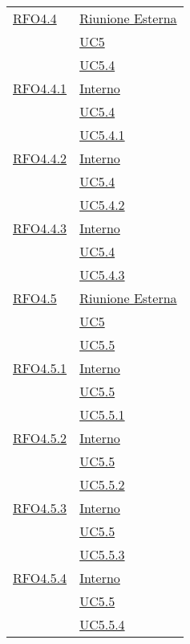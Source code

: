 \begin{longtable}{|>{\centering}m{5cm}|m{5cm}<{\centering}|}
\hyperlink{RFO4.4}{RFO4.4} &\hyperlink{Riunione Esterna}{Riunione Esterna}\\ &\hyperref[UC5]{UC5}\\ &\hyperref[UC5.4]{UC5.4}\\ \hline

\hyperlink{RFO4.4.1}{RFO4.4.1} &  \hyperlink{Interno}{Interno}\\ &\hyperref[UC5.4]{UC5.4}\\ &\hyperref[UC5.4.1]{UC5.4.1}\\ \hline

\hyperlink{RFO4.4.2}{RFO4.4.2} &  \hyperlink{Interno}{Interno}\\ &\hyperref[UC5.4]{UC5.4}\\ &\hyperref[UC5.4.2]{UC5.4.2}\\ \hline

\hyperlink{RFO4.4.3}{RFO4.4.3} & \hyperlink{Interno}{Interno}\\ &\hyperref[UC5.4]{UC5.4}\\ &\hyperref[UC5.4.3]{UC5.4.3}\\ \hline

\hyperlink{RFO4.5}{RFO4.5} &  \hyperlink{Riunione Esterna}{Riunione Esterna}\\ &\hyperref[UC5]{UC5}\\ &\hyperref[UC5.5]{UC5.5}\\ \hline

\hyperlink{RFO4.5.1}{RFO4.5.1} & \hyperlink{Interno}{Interno}\\ &\hyperref[UC5.5]{UC5.5}\\ &\hyperref[UC5.5.1]{UC5.5.1}\\ \hline

\hyperlink{RFO4.5.2}{RFO4.5.2} & \hyperlink{Interno}{Interno}\\ &\hyperref[UC5.5]{UC5.5}\\ &\hyperref[UC5.5.2]{UC5.5.2}\\ \hline

\hyperlink{RFO4.5.3}{RFO4.5.3} &  \hyperlink{Interno}{Interno}\\ &\hyperref[UC5.5]{UC5.5}\\ &\hyperref[UC5.5.3]{UC5.5.3}\\ \hline

\hyperlink{RFO4.5.4}{RFO4.5.4} & \hyperlink{Interno}{Interno}\\ &\hyperref[UC5.5]{UC5.5}\\ &\hyperref[UC5.5.4]{UC5.5.4}\\ \hline


\end{longtable}
